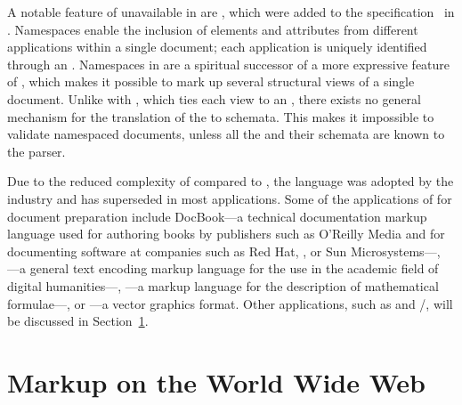 A notable feature of  unavailable in  are
, which were added to the
 specification~\cite{bray99} in \citeyear{bray99}. Namespaces
enable the inclusion of elements and attributes from different 
applications within a single  document; each application is
uniquely identified through an . Namespaces in  are a
spiritual successor of a more expressive  feature of
, which makes it possible
to mark up several structural views of a single document. Unlike with
, which ties each view to an  ,
there exists no general mechanism for the translation of the  to
 schemata. This makes it impossible to validate namespaced
 documents, unless all the  and their schemata are
known to the parser.


Due to the reduced complexity of  compared to , the
language was adopted by the industry and has superseded  in most
applications. Some of the applications of  for document preparation
include DocBook---a technical documentation markup language used for authoring books by
publishers such as O'Reilly Media and for documenting software at companies such
as Red Hat, , or Sun Microsystems---, ---a general
text encoding markup language for the use in the academic field of digital
humanities---, ---a markup language for the description of
mathematical formulae---, or ---a vector graphics format. Other
 applications, such as  and
/, will be discussed in
Section~\ref{sec:www-markup}.
      
\section{Markup on the World Wide Web}\label{sec:www-markup}
